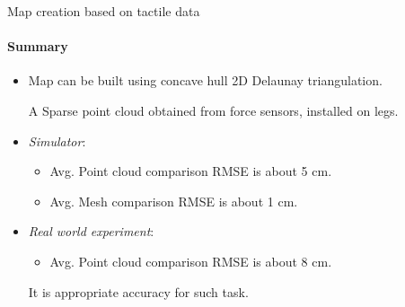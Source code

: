 \documentclass[aspectratio=169,xcolor=table]{beamer}
\begin{document}
\begin{frame}[t]{Map creation based on tactile data}
    \framesubtitle{Summary}
    \large
    \begin{itemize}
        \item Map can be built using concave hull 2D Delaunay triangulation.

              A Sparse point cloud obtained from force sensors, installed on legs.
        \item \textit{Simulator}: \begin{itemize}
            \large
                  \item Avg. Point cloud comparison RMSE is about 5 cm.
                  \item Avg. Mesh comparison RMSE is about 1 cm.
              \end{itemize}
        \item \textit{Real world experiment}: \begin{itemize}
            \large
                  \item Avg. Point cloud comparison RMSE is about 8 cm.
              \end{itemize}
              It is appropriate accuracy for such task.
    \end{itemize}
\end{frame}
\end{document}
